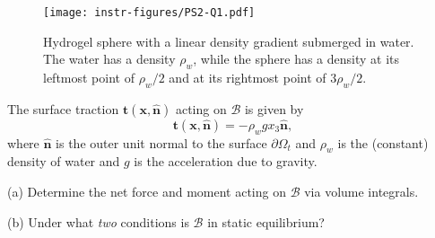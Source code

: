 \begin{figure}[H]
\vspace{-2em}
\centering
\texttt{[image: instr-figures/PS2-Q1.pdf]}
\caption{\small{Hydrogel sphere with a linear density gradient submerged in water. The water has a density $\rho_w$, while the sphere has a density at its leftmost point of $\rho_w/2$ and at its rightmost point of $3\rho_w/2$.}}
\end{figure}

\vspace{-1em}
The surface traction $\bm{t}(\bm{x},\hat{\bm{n}})$ acting on $\mathcal{B}$ is given by 
\begin{equation*}
\bm{t}(\bm{x},\hat{\bm{n}}) = -\rho_w g x_3 \hat{\bm{n}},
\end{equation*}
where $\hat{\bm{n}}$ is the outer unit normal to the surface $\partial \Omega_t$ and $\rho_w$ is the (constant) density of water and $g$ is the acceleration due to gravity. 

\medskip
(a) Determine the net force and moment acting on $\mathcal{B}$ via volume integrals.

\medskip
(b) Under what \textit{two} conditions is $\mathcal{B}$ in static equilibrium?

